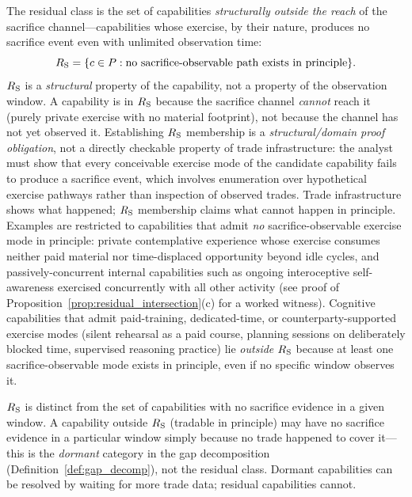 \begin{definition}
\label{def:residual_class}
The residual class is the set of capabilities \emph{structurally
outside the reach} of the sacrifice channel---capabilities whose
exercise, by their nature, produces no sacrifice event even with
unlimited observation time:
\[
  R_{\mathrm{S}} = \{c \in P : \text{no sacrifice-observable path exists
  in principle}\}.
\]
$R_{\mathrm{S}}$ is a \emph{structural} property of the capability, not a
property of the observation window.  A capability is in $R_{\mathrm{S}}$
because the sacrifice channel \emph{cannot} reach it (purely
private exercise with no material footprint), not because the
channel has not yet observed it.  Establishing $R_{\mathrm{S}}$
membership is a \emph{structural/domain proof obligation}, not
a directly checkable property of trade infrastructure: the
analyst must show that every conceivable exercise mode of the
candidate capability fails to produce a sacrifice event, which
involves enumeration over hypothetical exercise pathways
rather than inspection of observed trades.  Trade
infrastructure shows what happened; $R_{\mathrm{S}}$ membership claims
what cannot happen in principle.  Examples are restricted to
capabilities that admit \emph{no} sacrifice-observable exercise
mode in principle: private contemplative experience whose
exercise consumes neither paid material nor time-displaced
opportunity beyond idle cycles, and passively-concurrent
internal capabilities such as ongoing interoceptive
self-awareness exercised concurrently with all other activity
(see proof of
Proposition~\ref{prop:residual_intersection}(c) for a worked
witness).  Cognitive capabilities that admit paid-training,
dedicated-time, or counterparty-supported exercise modes
(silent rehearsal as a paid course, planning sessions on
deliberately blocked time, supervised reasoning practice) lie
\emph{outside} $R_{\mathrm{S}}$ because at least one
sacrifice-observable mode exists in principle, even if no
specific window observes it.
\end{definition}

\begin{remark}
$R_{\mathrm{S}}$ is distinct from the set of capabilities with no sacrifice
evidence in a given window.  A capability outside $R_{\mathrm{S}}$
(tradable in principle) may have no sacrifice evidence in a
particular window simply because no trade happened to cover
it---this is the \emph{dormant} category in the gap decomposition
(Definition~\ref{def:gap_decomp}), not the residual class.
Dormant capabilities can be resolved by waiting for more trade
data; residual capabilities cannot.
\end{remark}

